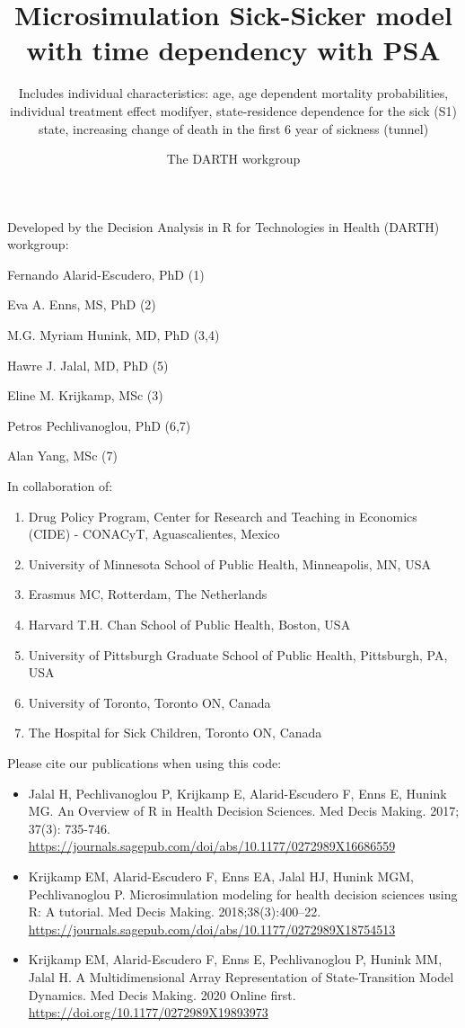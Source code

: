 \documentclass[
]{article}
\title{Microsimulation Sick-Sicker model with time dependency with PSA}
\subtitle{Includes individual characteristics: age, age dependent mortality
probabilities, individual treatment effect modifyer, state-residence
dependence for the sick (S1) state, increasing change of death in the
first 6 year of sickness (tunnel)}
\author{The DARTH workgroup}
\date{}
\providecommand{\tightlist}{%
  \setlength{\itemsep}{0pt}\setlength{\parskip}{0pt}}
\begin{document}
\maketitle

Developed by the Decision Analysis in R for Technologies in Health
(DARTH) workgroup:

Fernando Alarid-Escudero, PhD (1)

Eva A. Enns, MS, PhD (2)

M.G. Myriam Hunink, MD, PhD (3,4)

Hawre J. Jalal, MD, PhD (5)

Eline M. Krijkamp, MSc (3)

Petros Pechlivanoglou, PhD (6,7)

Alan Yang, MSc (7)

In collaboration of:

\begin{enumerate}
\def\labelenumi{\arabic{enumi}.}
\tightlist
\item
  Drug Policy Program, Center for Research and Teaching in Economics
  (CIDE) - CONACyT, Aguascalientes, Mexico
\item
  University of Minnesota School of Public Health, Minneapolis, MN, USA
\item
  Erasmus MC, Rotterdam, The Netherlands
\item
  Harvard T.H. Chan School of Public Health, Boston, USA
\item
  University of Pittsburgh Graduate School of Public Health, Pittsburgh,
  PA, USA
\item
  University of Toronto, Toronto ON, Canada
\item
  The Hospital for Sick Children, Toronto ON, Canada
\end{enumerate}

Please cite our publications when using this code:

\begin{itemize}
\item
  Jalal H, Pechlivanoglou P, Krijkamp E, Alarid-Escudero F, Enns E,
  Hunink MG. An Overview of R in Health Decision Sciences. Med Decis
  Making. 2017; 37(3): 735-746.
  \url{https://journals.sagepub.com/doi/abs/10.1177/0272989X16686559}
\item
  Krijkamp EM, Alarid-Escudero F, Enns EA, Jalal HJ, Hunink MGM,
  Pechlivanoglou P. Microsimulation modeling for health decision
  sciences using R: A tutorial. Med Decis Making. 2018;38(3):400--22.
  \url{https://journals.sagepub.com/doi/abs/10.1177/0272989X18754513}
\item
  Krijkamp EM, Alarid-Escudero F, Enns E, Pechlivanoglou P, Hunink MM,
  Jalal H. A Multidimensional Array Representation of State-Transition
  Model Dynamics. Med Decis Making. 2020 Online first.
  \url{https://doi.org/10.1177/0272989X19893973}
\end{itemize}
\end{document}
